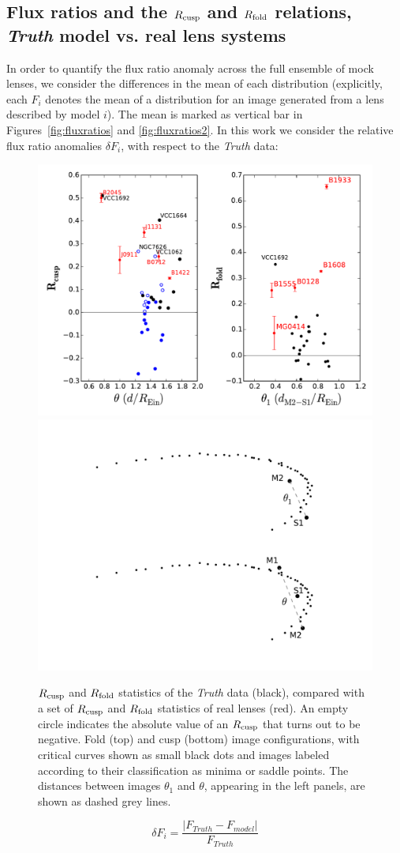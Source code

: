\subsection{Flux ratios and the $R_{\rm{cusp}}$ and $R_{\rm{fold}}$ relations, \textit{Truth} model vs. real lens systems}
In order to quantify the flux ratio anomaly across the full ensemble
of mock lenses, we consider the differences in the mean of each
distribution (explicitly, each $F_{i}$ denotes the mean of a
distribution for an image generated from a lens described by model
$i$). The mean is marked as vertical bar in
Figures~\ref{fig:fluxratios} and \ref{fig:fluxratios2}. In this work we consider the relative flux ratio anomalies $\delta F_i$, with respect to the \textit{Truth} data:
\begin{figure}
	\centering
	\includegraphics[trim=0cm 0cm 0cm 0cm,clip,width=.6\textwidth]{./figures_sls/dmax_vs_Rcuspfold-eps-converted-to.pdf}
	\includegraphics[trim=12cm 1cm 0cm 0.5cm,clip,width=.3\textwidth]{./figures_sls/fold_theta1.pdf}
	\caption[$R_{\rm{cusp}}$ and $R_{\rm{fold}}$ statistics of the \textit{Truth} models comapred with real lenses]{\label{fig:Rcuspfold_vs_real}$R_{\rm{cusp}}$ and $R_{\rm{fold}}$ statistics of the \textit{Truth} data (black), compared with a set of $R_{\rm{cusp}}$ and $R_{\rm{fold}}$ statistics of real lenses (red). An empty circle indicates the absolute value of an $R_{\rm{cusp}}$ that turns out to be negative. Fold (top) and cusp (bottom) image configurations,  with critical curves shown as small black dots and images labeled according to their classification as minima or saddle points. The distances between images $\theta_1$ and $\theta$, appearing in the left panels, are shown as dashed grey lines.}
\end{figure}
\begin{equation}
\nonumber \delta F_i = \frac{| F_{Truth} - F_{model} |}{F_{Truth}}
\end{equation}

